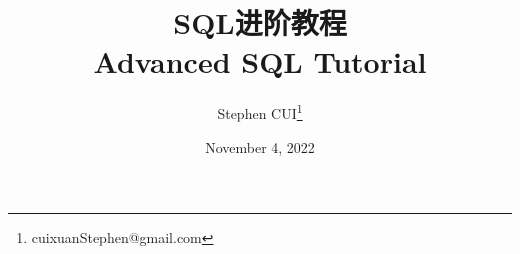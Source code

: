 \documentclass[openany]{book}
\title{SQL进阶教程\\ \textbf{Advanced SQL Tutorial}}
\author{Stephen CUI\thanks{cuixuanStephen@gmail.com}
}
\date{November 4, 2022}
\begin{document}
\frontmatter
\maketitle
\begin{multicols}{2}
    \tableofcontents
\end{multicols}

\mainmatter

\end{document}

